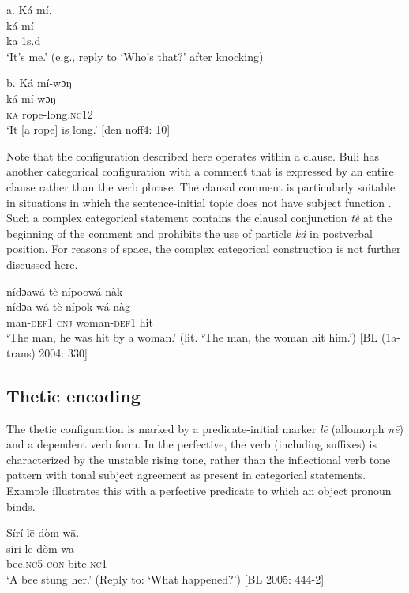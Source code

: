 \documentclass[output=paper]{langsci/langscibook}
\begin{document}
\ea
\glll \textup{}  \textup{a.}  Ká  mí.\\
  \textup{ká  mí}\\
     ka  1s.d\\
\glt   ‘It’s me.’ (e.g., reply to ‘Who’s that?’ after knocking) \citep[269]{Schwarz2009}
\z

\ea
\glll         \textup{ b.}  Ká  mí-wɔŋ\\
  \textup{ká  mí-wɔŋ}\\
     \textsc{ka}  rope-long.\textsc{nc}12\\
\glt   ‘It [a rope] is long.’ [den noff4: 10]
\z

Note that the configuration described here operates within a clause. Buli has another categorical configuration with a comment that is expressed by an entire clause rather than the verb phrase. The clausal comment is particularly suitable in situations in which the sentence-initial topic does not have subject function . Such a complex categorical statement contains the clausal conjunction \textit{tè} at the beginning of the comment and prohibits the use of particle \textit{ká }in postverbal position.\textit{ }For reasons of space, the complex categorical construction is not further discussed here.

\ea
\gll \textup{}  nídɔ\={a}wá  tè  níp\={o}\={o}wá  nàk\\
  \textup{  nídɔa-wá  tè  níp\={o}k-wá  nàg}\\
\glt man-\textsc{def}1  \textsc{cnj}  woman-\textsc{def}1  hit\\
‘The man, he was hit by a woman.’ (lit. ‘The man, the woman hit him.’) [BL (1a-trans) 2004: 330] 
\z

\subsection{Thetic encoding}

The thetic configuration is marked by a predicate-initial marker \textit{l\={e}} (allomorph \textit{n\={e}}) and a dependent verb form. In the perfective, the verb (including suffixes) is characterized by the unstable rising tone, rather than the inflectional verb tone pattern with tonal subject agreement as present in categorical statements. Example  illustrates this with a perfective predicate to which an object pronoun binds.

\ea
\glll \textup{}  Sírí    l\={e}  dòm  w\={a}.\\
  \textup{  síri    l\={e}  dòm-w\={a}}\\
       bee.\textsc{nc}5  \textsc{con}  bite-\textsc{nc}1\\
\glt ‘A bee stung her.’ (Reply to: ‘What happened?’) [BL  2005: 444-2]
\z
\end{document}
